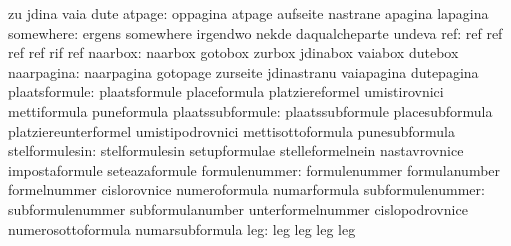                                   zu                               jdina
                                  vaia                             dute
                          atpage: oppagina                         atpage
                                  aufseite                         nastrane
                                  apagina                          lapagina
                       somewhere: ergens                           somewhere
                                  irgendwo                         nekde
                                  daqualcheparte                   undeva
                             ref: ref                              ref
                                  ref                              ref
                                  rif                              ref
                         naarbox: naarbox                          gotobox
                                  zurbox                           jdinabox
                                  vaiabox                          dutebox  %
                      naarpagina: naarpagina                       gotopage
                                  zurseite                         jdinastranu
                                  vaiapagina                       dutepagina
                   plaatsformule: plaatsformule                    placeformula
                                  platziereformel                  umistirovnici
                                  mettiformula                     puneformula
                plaatssubformule: plaatssubformule                 placesubformula
                                  platziereunterformel             umistipodrovnici
                                  mettisottoformula                punesubformula
                  stelformulesin: stelformulesin                   setupformulae
                                  stelleformelnein                 nastavrovnice
                                  impostaformule                   seteazaformule
                   formulenummer: formulenummer                    formulanumber
                                  formelnummer                     cislorovnice
                                  numeroformula                    numarformula
                subformulenummer: subformulenummer                 subformulanumber
                                  unterformelnummer                cislopodrovnice
                                  numerosottoformula               numarsubformula
                             leg: leg                              leg
                                  leg                              leg
